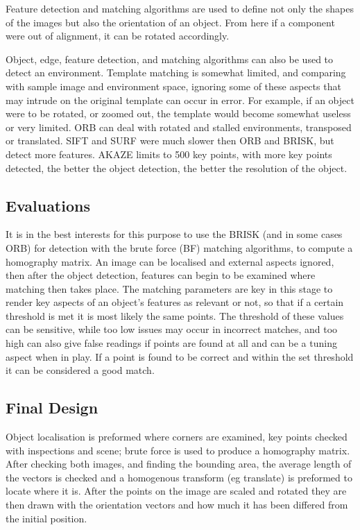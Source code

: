 \documentclass[a4paper, 10pt]{IEEEconf}
\begin{document}
Feature detection and matching algorithms are used to define not only the shapes of the images but also the orientation of an object. From here if a component were out of alignment, it can be rotated accordingly. 

Object, edge, feature detection, and matching algorithms can also be used to detect an environment. Template matching is somewhat limited, and comparing with sample image and environment space, ignoring some of these aspects that may intrude on the original template can occur in error. For example, if an object were to be rotated, or zoomed out, the template would become somewhat useless or very limited. ORB can deal with rotated and stalled environments, transposed or translated. SIFT and SURF were much slower then ORB and BRISK, but detect more features. AKAZE limits to 500 key points, with more key points detected, the better the object detection, the better the resolution of the object.

\subsection{Evaluations}

It is in the best interests for this purpose to use the BRISK (and in some cases ORB) for detection with the brute force (BF) matching algorithms, to compute a homography matrix. An image can be localised and external aspects ignored, then after the object detection, features can begin to be examined where matching then takes place. The matching parameters are key in this stage to render key aspects of an object's features as relevant or not, so that if a certain threshold is met it is most likely the same points. The threshold of these values can be sensitive, while too low issues may occur in incorrect matches, and too high can also give false readings if points are found at all and can be a tuning aspect when in play. If a point is found to be correct and within the set threshold it can be considered a good match. 

\subsection{Final Design}

Object localisation is preformed where corners are examined, key points checked with inspections and scene; brute force is used to produce a homography matrix. After checking both images, and finding the bounding area, the average length of the vectors is checked and a homogenous transform (eg translate) is preformed to locate where it is. After the points on the image are scaled and rotated they are then drawn with the orientation vectors and how much it has been differed from the initial position.
\end{document}
